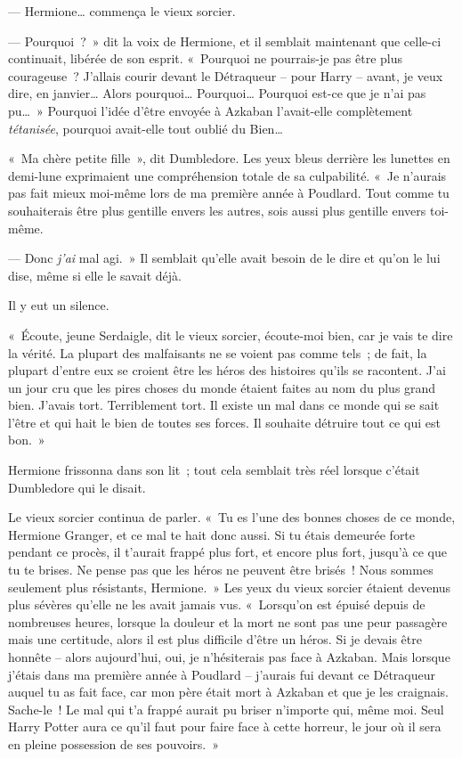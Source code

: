 --- Hermione… commença le vieux sorcier.

--- Pourquoi~?~»
dit la voix de Hermione, et il semblait maintenant que celle-ci continuait, libérée de son esprit.
«~Pourquoi ne pourrais-je pas être plus courageuse~?
J'allais courir devant le Détraqueur -- pour Harry -- avant, je veux dire, en janvier…
Alors pourquoi…
Pourquoi…
Pourquoi est-ce que je n'ai pas pu…~»
Pourquoi l'idée d'être envoyée à Azkaban l'avait-elle complètement \emph{tétanisée}, pourquoi avait-elle tout oublié du Bien…

«~Ma chère petite fille~», dit Dumbledore.
Les yeux bleus derrière les lunettes en demi-lune exprimaient une compréhension totale de sa culpabilité.
«~Je n'aurais pas fait mieux moi-même lors de ma première année à Poudlard.
Tout comme tu souhaiterais être plus gentille envers les autres, sois aussi plus gentille envers toi-même.

--- Donc \emph{j'ai} mal agi.~»
Il semblait qu'elle avait besoin de le dire et qu'on le lui dise, même si elle le savait déjà.

Il y eut un silence.

«~Écoute, jeune Serdaigle, dit le vieux sorcier, écoute-moi bien, car je vais te dire la vérité.
La plupart des malfaisants ne se voient pas comme tels~; de fait, la plupart d'entre eux se croient être les héros des histoires qu'ils se racontent.
J'ai un jour cru que les pires choses du monde étaient faites au nom du plus grand bien.
J'avais tort.
Terriblement tort.
Il existe un mal dans ce monde qui se sait l'être et qui hait le bien de toutes ses forces.
Il souhaite détruire tout ce qui est bon.~»

Hermione frissonna dans son lit~; tout cela semblait très réel lorsque c'était Dumbledore qui le disait.

Le vieux sorcier continua de parler.
«~Tu es l'une des bonnes choses de ce monde, Hermione Granger, et ce mal te hait donc aussi.
Si tu étais demeurée forte pendant ce procès, il t'aurait frappé plus fort, et encore plus fort, jusqu'à ce que tu te brises.
Ne pense pas que les héros ne peuvent être brisés~!
Nous sommes seulement plus résistants, Hermione.~»
Les yeux du vieux sorcier étaient devenus plus sévères qu'elle ne les avait jamais vus.
«~Lorsqu'on est épuisé depuis de nombreuses heures, lorsque la douleur et la mort ne sont pas une peur passagère mais une certitude, alors il est plus difficile d'être un héros.
Si je devais être honnête -- alors aujourd'hui, oui, je n'hésiterais pas face à Azkaban.
Mais lorsque j'étais dans ma première année à Poudlard -- j'aurais fui devant ce Détraqueur auquel tu as fait face, car mon père était mort à Azkaban et que je les craignais.
Sache-le~!
Le mal qui t'a frappé aurait pu briser n'importe qui, même moi.
Seul Harry Potter aura ce qu'il faut pour faire face à cette horreur, le jour où il sera en pleine possession de ses pouvoirs.~»

